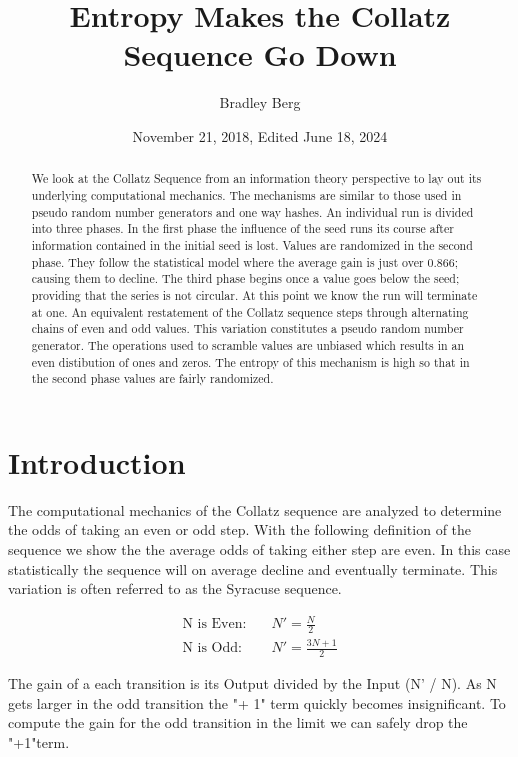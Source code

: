 \documentclass[letterpaper]{article}
\title{Entropy Makes the Collatz Sequence Go Down}
\author{Bradley Berg}
\date{November 21, 2018, Edited June 18, 2024}
\begin{document}
\maketitle

\twocolumn

\begin{abstract}
We look at the Collatz Sequence from an information theory perspective to lay out its underlying computational mechanics. The mechanisms are similar to those used in pseudo random number generators and one way hashes.
An individual run is divided into three phases.  In the first phase the influence of the seed runs its course after information contained in the initial seed is lost.  Values are randomized in the second phase.  They follow the statistical model where the average gain is just over 0.866; causing them to decline.  The third phase begins once a value goes below the seed; providing that the series is not circular.  At this point we know the run will terminate at one.
An equivalent restatement of the Collatz sequence steps through alternating chains of even and odd values.  This variation constitutes a pseudo random number generator.  The operations used to scramble values are unbiased which results in an even distibution of ones and zeros.  The entropy of this mechanism is high so that in the second phase values are fairly randomized.
\end{abstract}

\section{Introduction}


The computational mechanics of the Collatz sequence are analyzed to determine the odds of taking an even or odd step. With the following definition of the sequence we show the the average odds of taking either step are even. In this case statistically the sequence will on average decline and eventually terminate. This variation is often referred to as the Syracuse sequence.

\begin{align*}
    \text{N is Even:} & \quad N' = \frac{N}{2} \\
    \text{N is Odd:} & \quad N' = \frac{3N + 1}{2}
\end{align*}

The gain of a each transition is its Output divided by the Input (N' / N). As N gets larger in the odd transition the "+ 1" term quickly becomes insignificant. To compute the gain for the odd transition in the limit we can safely drop the "+1"term.
\end{document}
